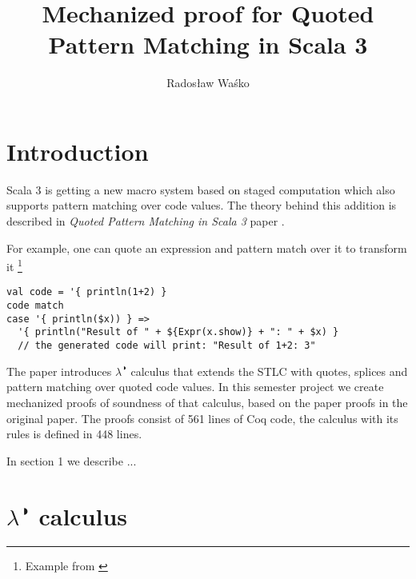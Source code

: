 \documentclass[runningheads]{article}
\begin{document}
\title{Mechanized proof for Quoted Pattern Matching in Scala 3}
%
\author{Radosław Waśko}

%
%
%
\maketitle              %
\begin{abstract}
%
\end{abstract}
%
%
\section{Introduction}

Scala 3 is getting a new macro system based on staged computation \cite{dottydoc} which also supports pattern matching over code values. The theory behind this addition is described in \textit{Quoted Pattern Matching in Scala 3} paper \cite{QPM}. 

For example, one can quote an expression and pattern match over it to transform it \footnote{Example from \cite{QPM}}
\begin{verbatim}
val code = '{ println(1+2) }
code match
case '{ println($x)) } =>
  '{ println("Result of " + ${Expr(x.show)} + ": " + $x) }
  // the generated code will print: "Result of 1+2: 3"
\end{verbatim}

The paper introduces $\lambda^{\RIGHTcircle}$ calculus that extends the STLC with quotes, splices and pattern matching over quoted code values. In this semester project we create mechanized proofs of soundness of that calculus, based on the paper proofs in the original paper. The proofs consist of 561 lines of Coq code,
the calculus with its rules is defined in 448 lines.

In section 1 we describe ... 

\section{$\lambda^{\RIGHTcircle}$ calculus}
\end{document}
